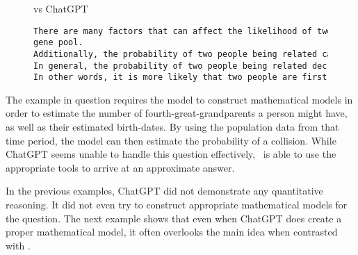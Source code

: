 \begin{figure}[H]
\begin{AIbox}{\DV vs ChatGPT}
\begin{verbatim}
There are many factors that can affect the likelihood of two people being related, including their family histories and the size of their 
gene pool. 
Additionally, the probability of two people being related can vary significantly depending on the specific relationship in question. 
In general, the probability of two people being related decreases as the degree of cousinhood increases. 
In other words, it is more likely that two people are first cousins than it is that they are fifth cousins.
\end{verbatim}
\end{AIbox}
\end{figure}

The example in question requires the model to construct mathematical models in order to estimate the number of fourth-great-grandparents a person might have, as well as their estimated birth-dates. By using the population data from that time period, the model can then estimate the probability of a collision. While ChatGPT seems unable to handle this question effectively, \DV \ is able to use the appropriate tools to arrive at an approximate answer.

In the previous examples, ChatGPT did not demonstrate any quantitative reasoning. It did not even try to construct appropriate mathematical models for the question. The next example shows that even when ChatGPT does create a proper mathematical model, it often overlooks the main idea when contrasted with \DV.


